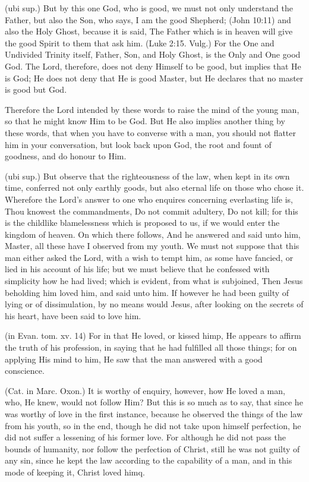  (ubi sup.) But by this one God, who is good, we must not only understand the Father, but also the Son, who says, I am the good Shepherd; (John 10:11) and also the Holy Ghost, because it is said, The Father which is in heaven will give the good Spirit to them that ask him. (Luke 2:15. Vulg.) For the One and Undivided Trinity itself, Father, Son, and Holy Ghost, is the Only and One good God. The Lord, therefore, does not deny Himself to be good, but implies that He is God; He does not deny that He is good Master, but He declares that no master is good but God.

 Therefore the Lord intended by these words to raise the mind of the young man, so that he might know Him to be God. But He also implies another thing by these words, that when you have to converse with a man, you should not flatter him in your conversation, but look back upon God, the root and fount of goodness, and do honour to Him.

 (ubi sup.) But observe that the righteousness of the law, when kept in its own time, conferred not only earthly goods, but also eternal life on those who chose it. Wherefore the Lord’s answer to one who enquires concerning everlasting life is, Thou knowest the commandments, Do not commit adultery, Do not kill; for this is the childlike blamelessness which is proposed to us, if we would enter the kingdom of heaven. On which there follows, And he answered and said unto him, Master, all these have I observed from my youth. We must not suppose that this man either asked the Lord, with a wish to tempt him, as some have fancied, or lied in his account of his life; but we must believe that he confessed with simplicity how he had lived; which is evident, from what is subjoined, Then Jesus beholding him loved him, and said unto him. If however he had been guilty of lying or of dissimulation, by no means would Jesus, after looking on the secrets of his heart, have been said to love him.

 (in Evan. tom. xv. 14) For in that He loved, or kissed himp, He appears to affirm the truth of his profession, in saying that he had fulfilled all those things; for on applying His mind to him, He saw that the man answered with a good conscience.

 (Cat. in Marc. Oxon.) It is worthy of enquiry, however, how He loved a man, who, He knew, would not follow Him? But this is so much as to say, that since he was worthy of love in the first instance, because he observed the things of the law from his youth, so in the end, though he did not take upon himself perfection, he did not suffer a lessening of his former love. For although he did not pass the bounds of humanity, nor follow the perfection of Christ, still he was not guilty of any sin, since he kept the law according to the capability of a man, and in this mode of keeping it, Christ loved himq.

